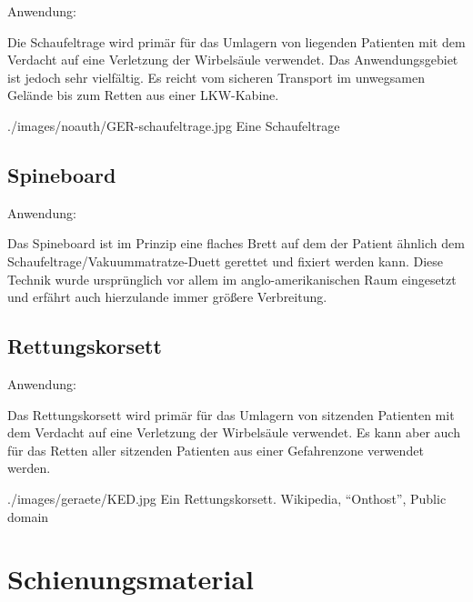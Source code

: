 {
Anwendung: 

Die Schaufeltrage wird primär für das Umlagern von liegenden
Patienten mit dem Verdacht auf eine Verletzung der
Wirbelsäule verwendet. Das Anwendungsgebiet ist jedoch sehr
vielfältig. Es reicht vom sicheren Transport im unwegsamen
Gelände bis zum Retten aus einer LKW-Kabine.
}{

}
{./images/noauth/GER-schaufeltrage.jpg}
{Eine Schaufeltrage}
{}

\subsection{Spineboard}
\label{topic:spineboard-beschreibung}

Anwendung: 

Das Spineboard ist im Prinzip eine flaches Brett auf dem
der Patient ähnlich dem Schaufeltrage/Vakuummatratze-Duett
gerettet und fixiert werden kann. Diese Technik wurde
ursprünglich vor allem im anglo-amerikanischen Raum
eingesetzt und erfährt auch hierzulande immer größere
Verbreitung.



\subsection{Rettungskorsett}
\label{topic:rettungskorsett-beschreibung}

Anwendung: 

{
Das Rettungskorsett wird primär für das Umlagern von
sitzenden Patienten mit dem Verdacht auf eine Verletzung der
Wirbelsäule verwendet. Es kann aber auch für das Retten
aller sitzenden Patienten aus einer Gefahrenzone verwendet
werden.
}{

}
{./images/geraete/KED.jpg}
{Ein Rettungskorsett.}
{Wikipedia, "`Onthost"', Public domain}




   
\clearpage
\section{Schienungsmaterial}

